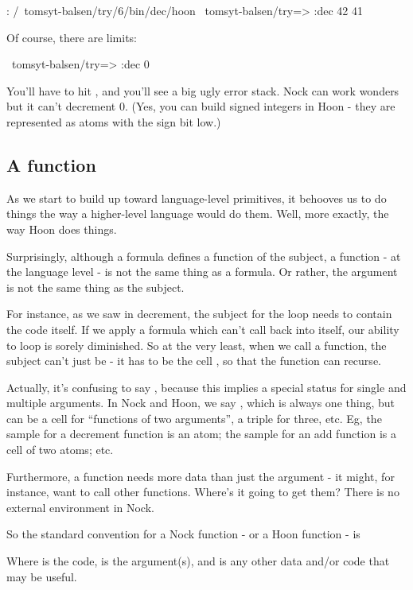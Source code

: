 \begin{code}
: /~tomsyt-balsen/try/6/bin/dec/hoon
~tomsyt-balsen/try=> :dec 42
41
\end{code}
Of course, there are limits:

\begin{code}
~tomsyt-balsen/try=> :dec 0
\end{code}
You'll have to hit , and you'll see a big ugly error stack.
Nock can work wonders but it can't decrement 0.  (Yes, you can
build signed integers in Hoon - they are represented as atoms
with the sign bit low.)

\subsection{A function}

As we start to build up toward language-level primitives, it
behooves us to do things the way a higher-level language would do
them.  Well, more exactly, the way Hoon does things.

Surprisingly, although a formula defines a function of the
subject, a function - at the language level - is not the same
thing as a formula.  Or rather, the argument is not the same
thing as the subject.

For instance, as we saw in decrement, the subject for the loop
needs to contain the code itself.  If we apply a formula which
can't call back into itself, our ability to loop is sorely
diminished.  So at the very least, when we call a function,
the subject can't just be  - it has to be the cell
, so that the function can recurse.

Actually, it's confusing to say , because this implies
a special status for single and multiple arguments.  In Nock and
Hoon, we say , which is always one thing, but can be a
cell for ``functions of two arguments'', a triple for three, etc.
Eg, the sample for a decrement function is an atom; the sample
for an add function is a cell of two atoms; etc.

Furthermore, a function needs more data than just the argument -
it might, for instance, want to call other functions.  Where's it
going to get them?  There is no external environment in Nock.

So the standard convention for a Nock function - or a Hoon
function - is

\begin{code}
\end{code}
Where  is the code,  is the argument(s), and
 is any other data and/or code that may be useful.

